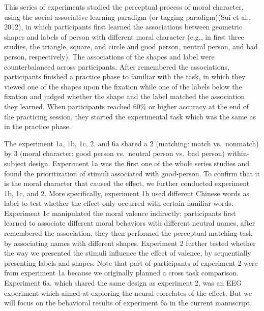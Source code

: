 \documentclass[
  english,
  man]{apa6}
\begin{document}
This series of experiments studied the perceptual process of moral character, using the social associative learning paradigm (or tagging paradigm)(Sui et al., 2012), in which participants first learned the associations between geometric shapes and labels of person with different moral character (e.g., in first three studies, the triangle, square, and circle and good person, neutral person, and bad person, respectively). The associations of the shapes and label were counterbalanced across participants. After remembered the associations, participants finished a practice phase to familiar with the task, in which they viewed one of the shapes upon the fixation while one of the labels below the fixation and judged whether the shape and the label matched the association they learned. When participants reached 60\% or higher accuracy at the end of the practicing session, they started the experimental task which was the same as in the practice phase.

The experiment 1a, 1b, 1c, 2, and 6a shared a 2 (matching: match vs.~nonmatch) by 3 (moral character: good person vs.~neutral person vs.~bad person) within-subject design. Experiment 1a was the first one of the whole series studies and found the prioritization of stimuli associated with good-person. To confirm that it is the moral character that caused the effect, we further conducted experiment 1b, 1c, and 2. More specifically, experiment 1b used different Chinese words as label to test whether the effect only occurred with certain familiar words. Experiment 1c manipulated the moral valence indirectly: participants first learned to associate different moral behaviors with different neutral names, after remembered the association, they then performed the perceptual matching task by associating names with different shapes. Experiment 2 further tested whether the way we presented the stimuli influence the effect of valence, by sequentially presenting labels and shapes. Note that part of participants of experiment 2 were from experiment 1a because we originally planned a cross task comparison. Experiment 6a, which shared the same design as experiment 2, was an EEG experiment which aimed at exploring the neural correlates of the effect. But we will focus on the behavioral results of experiment 6a in the current manuscript.
\end{document}
